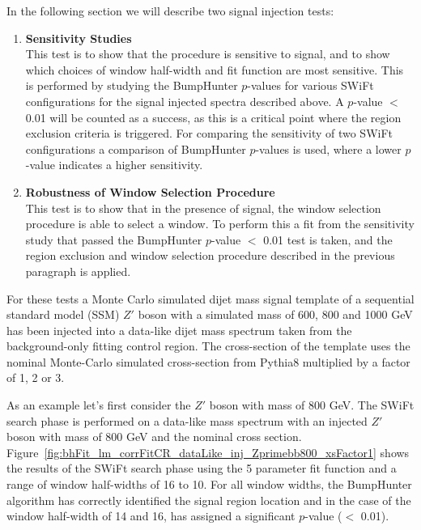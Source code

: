 \noindent
In the following section we will describe two signal injection tests:
\begin{enumerate}
  \item\textbf{Sensitivity Studies}\\
  This test is to show that the procedure is sensitive to signal,
  and to show which choices of window half-width and fit function are most sensitive.
  This is performed by studying the {\sc BumpHunter} \mbox{$p$-value}s for various SWiFt configurations for the signal injected spectra described above.
  A \mbox{$p$-value} $<$ 0.01 will be counted as a success, as this is a critical point  where the region exclusion criteria is triggered.
  For comparing the sensitivity of two SWiFt configurations a comparison of
  {\sc BumpHunter} \mbox{$p$-value}s is used, where a lower \mbox{$p$-value} indicates a higher sensitivity.\vspace{1em}
  
  \item\textbf{Robustness of Window Selection Procedure}\\
  This test is to show that in the presence of signal, the window selection procedure is able to select a window.
  To perform this a fit from the sensitivity study that passed the {\sc BumpHunter} \mbox{$p$-value} $<$ 0.01 test is taken,
  and the region exclusion and  window selection procedure described in the previous paragraph is applied.
\end{enumerate}



For these tests a Monte Carlo simulated dijet mass signal template of a sequential standard model (SSM) $Z'$ boson with a simulated mass of 600, 800 and 1000 GeV
has been injected into a data-like dijet mass spectrum taken from the background-only fitting control region.
The cross-section of the template uses the nominal Monte-Carlo simulated cross-section from { \sc Pythia8} multiplied by a factor of 1, 2 or 3.

As an example let's first consider the $Z'$ boson with mass of 800 GeV.
The  SWiFt search phase is performed on a data-like mass spectrum
with an injected  $Z'$ boson with mass of 800 GeV and the nominal cross section.
Figure~\ref{fig:bhFit_lm_corrFitCR_dataLike_inj_Zprimebb800_xsFactor1}
shows the results of the SWiFt search phase
using the 5 parameter fit function and a range of window half-widths of 16 to 10.
For all window widths, the {\sc BumpHunter} algorithm has correctly identified the signal region location
and in the case of the window half-width of 14 and 16, has assigned a significant \mbox{\mbox{$p$-value}} ($<$ 0.01).

